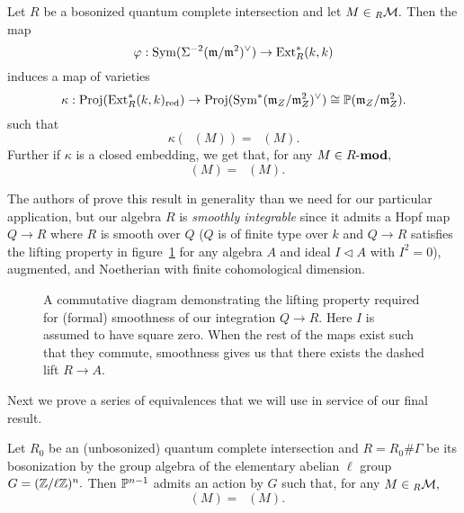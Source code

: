 \documentclass [11pt, proquest] {uwthesis}[2020/02/24]
\DeclareMathOperator{\supphR}{supp^\mathit{hyp}_R}
\DeclareMathOperator{\supphRnaught}{supp^\mathit{hyp}_{R_0}}
\DeclareMathOperator{\suppc}{supp^\mathit{coh}_R}
\begin{document}
    \begin{thm}\label{thm:np-supph-suppc}
        Let $R$ be a bosonized quantum complete intersection and let $M\in{_R\mathcal{M}}.$ Then the map
        \[\varphi:\operatorname{Sym}(\Sigma^{-2}(\mathfrak{m}/\mathfrak{m}^2)^\vee)\to \operatorname{Ext}_R^\ast(k,k)\]
        induces a map of varieties
        \[\kappa:\operatorname{Proj}(\operatorname{Ext}^\ast_R(k,k)_\text{red})\to \operatorname{Proj}(\operatorname{Sym}^\ast(\mathfrak{m}_Z/\mathfrak{m}_Z^2)^\vee)\cong\mathbb{P}(\mathfrak{m}_Z/\mathfrak{m}_Z^2).\]
        such that
        \[\kappa(\suppc(M))=\supphR(M).\]
        Further if $\kappa$ is a closed embedding, we get that, for any $M\in R\text{-}\mathbf{mod},$
        \[\suppc(M)=\supphR(M).\]
    \end{thm}
    The authors of \cite{negron-pevtsovaI} prove this result in generality than we need for our particular application, but our algebra $R$ is \textit{smoothly integrable} since it admits a Hopf map $Q\to R$ where $R$ is smooth over $Q$ ($Q$ is of finite type over $k$ and $Q\to R$ satisfies the lifting property in figure~\ref{fig:formally-smooth} for any algebra $A$ and ideal $I\lhd A$ with $I^2=0$), augmented, and Noetherian with finite cohomological dimension. 
    
    \begin{figure}
        \centering
        \caption{A commutative diagram demonstrating the lifting property required for (formal) smoothness of our integration $Q\to R.$ Here $I$ is assumed to have square zero. When the rest of the maps exist such that they commute, smoothness gives us that there exists the dashed lift $R\to A.$}
        \label{fig:formally-smooth}
    \end{figure}
    
    Next we prove a series of equivalences that we will use in service of our final result.
    
    \begin{conj}\label{lem:G-action-bosonization}
        Let $R_0$ be an (unbosonized) quantum complete intersection and $R=R_0\#\Gamma$ be its bosonization by the group algebra of the elementary abelian $\ell$ group $G=(\mathbb{Z}/\ell\mathbb{Z})^n.$ Then $\mathbb{P}^{n-1}$ admits an action by $G$ such that, for any $M\in{_R\mathcal{M}},$
        \[\supphR(M)=\supphRnaught(M).\]
    \end{conj}
        
\end{document}
